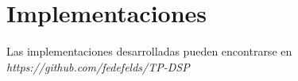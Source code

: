 \documentclass[]{article}
\begin{document}
\section{Implementaciones}
Las implementaciones desarrolladas pueden encontrarse en \emph{https://github.com/fedefelds/TP-DSP}
%
%
\end{document}
